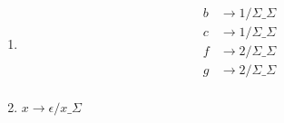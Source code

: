 \documentclass[12 pt]{article}
\begin{document}
\begin{enumerate}
\begin{enumerate}
		\item
			\begin{align*}
				b &\rightarrow 1 / \Sigma \_ \Sigma \\
				c &\rightarrow 1 / \Sigma \_ \Sigma \\
				f &\rightarrow 2 / \Sigma \_ \Sigma \\
				g &\rightarrow 2 / \Sigma \_ \Sigma \\
			\end{align*}
		\item $x \rightarrow \epsilon / x\_\Sigma$
	\end{enumerate}
\end{enumerate}
\end{document}

